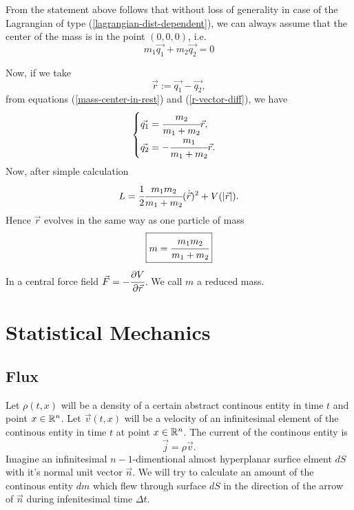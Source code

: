 \documentclass[main.tex]{subfiles}
\begin{document}
From the statement above follows that without loss of generality in case of the Lagrangian of type (\ref{lagrangian-dist-dependent}), we can always assume that the center of the mass is in the point $(0,0,0)$, i.e.
\begin{equation}
\label{mass-center-in-rest}
m_1\vec{q_1} + m_2\vec{q_2} = 0
\end{equation}

Now, if we take
\begin{equation}
\label{r-vector-diff}
\vec{r} := \vec{q_1} - \vec{q_2}, 
\end{equation}
from equations (\ref{mass-center-in-rest}) and (\ref{r-vector-diff}), we have
\begin{equation}
\begin{cases}
\vec{q_1} = \cfrac{m_2}{m_1 + m_2}\vec{r},\\
\vec{q_2} = - \cfrac{m_1}{m_1 + m_2}\vec{r}.
\end{cases}
\end{equation}
Now, after simple calculation
\begin{equation}
L = \cfrac{1}{2}\cfrac{m_1m_2}{m_1 + m_2}(\dot{\vec{r}})^2 + V(|\vec{r}|). 
\end{equation}
Hence $\vec{r}$ evolves in the same way as one particle of mass
\begin{equation}
\boxed{
m = \cfrac{m_1m_2}{m_1 + m_2}
}
\end{equation}
In a central force field $\vec{F} = - \cfrac{\partial V}{\partial \vec{r}}$. We call $m$ a reduced mass.
\section{Statistical Mechanics}
\subsection{Flux}
Let $\rho(t,x)$ will be a density of a certain abstract continous entity in time $t$ and point $x\in\mathbb{R}^n$. Let $\vec{v}(t,x)$ will be a velocity of an infinitesimal element of the continous entity in time $t$ at point $x\in\mathbb{R}^n$.
The current of the continous entity is
\begin{equation}
\vec{j} = \rho \vec{v}.
\end{equation}
Imagine an infinitesimal $n-1$-dimentional almost hyperplanar surfice elment $dS$ with it's normal unit vector $\vec{n}$. We will try to calculate an amount of the continous entity $dm$ which flew through surface $dS$ in the direction of the arrow of $\vec{n}$ during infenitesimal time $\Delta t$.
 
\end{document}
